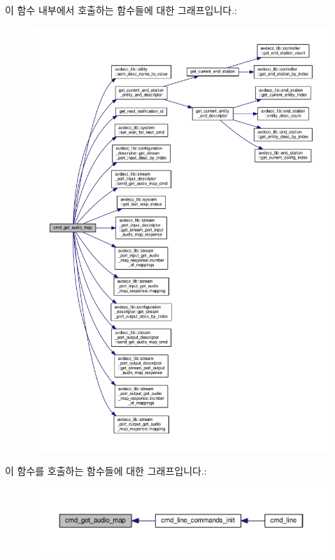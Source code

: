 이 함수 내부에서 호출하는 함수들에 대한 그래프입니다.\+:
\nopagebreak
\begin{figure}[H]
\begin{center}
\leavevmode
\includegraphics[width=350pt]{classcmd__line_a60c1233984e8d4ecbde33a91f5968b20_cgraph}
\end{center}
\end{figure}




이 함수를 호출하는 함수들에 대한 그래프입니다.\+:
\nopagebreak
\begin{figure}[H]
\begin{center}
\leavevmode
\includegraphics[width=350pt]{classcmd__line_a60c1233984e8d4ecbde33a91f5968b20_icgraph}
\end{center}
\end{figure}


